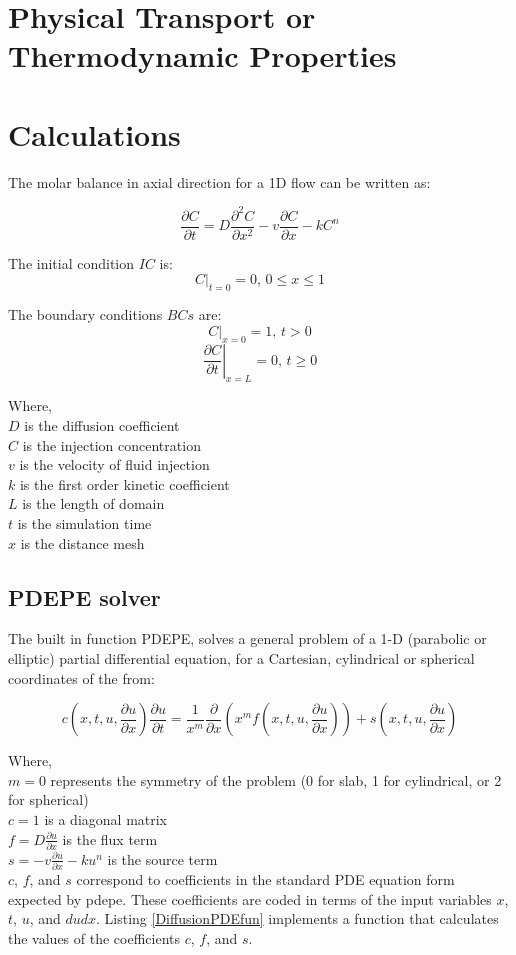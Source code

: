 \documentclass{article}
\begin{document}
\section{Physical Transport or Thermodynamic Properties}

\section{Calculations}

The molar balance in axial direction for a 1D flow can be written as:

$$ \frac{\partial C}{\partial t} = D \frac{\partial^2 C}{\partial x^2} - v \frac{\partial C}{\partial x} - k C^n $$

The initial condition $IC$ is:
$$ \left. C \right|_{t = 0} = 0 \textrm{, } 0 \leq x \leq 1 $$

The boundary conditions $BCs$ are:
$$ \left. C \right|_{x = 0} = 1 \textrm{, } t > 0 $$
$$ \left. \frac{\partial C}{\partial t} \right|_{x = L} = 0 \textrm{, } t \geq 0 $$

Where, \\
$D$ is the diffusion coefficient \\
$C$ is the injection concentration \\
$v$ is the velocity of fluid injection \\
$k$ is the first order kinetic coefficient \\
$L$ is the length of domain \\
$t$ is the simulation time \\
$x$ is the distance mesh

\subsection{PDEPE solver}

The built in function PDEPE, solves a general problem of a 1-D (parabolic or elliptic) partial differential equation, for a Cartesian, cylindrical or spherical coordinates of the from:

$$ c \left( x, t, u, \frac{\partial u}{\partial x} \right) \frac{\partial u}{\partial t} = \frac{1}{x^m} \frac{\partial}{\partial x} \left( x^m f \left( x, t, u, \frac{\partial u}{\partial x} \right) \right) + s \left( x, t, u, \frac{\partial u}{\partial x} \right) $$

Where, \\
$\displaystyle m = 0$ represents the symmetry of the problem (0 for slab, 1 for cylindrical, or 2 for spherical) \\
$\displaystyle c = 1$ is a diagonal matrix \\
$\displaystyle f = D \frac{\partial u}{\partial x}$ is the flux term\\
$\displaystyle s = - v \frac{\partial u}{\partial x} - k u^n$ is the source term \\
$c$, $f$, and $s$ correspond to coefficients in the standard PDE equation form expected by pdepe. These coefficients are coded in terms of the input variables $x$, $t$, $u$, and $dudx$. Listing \ref{DiffusionPDEfun} implements a function that calculates the values of the coefficients $c$, $f$, and $s$.
\end{document}
